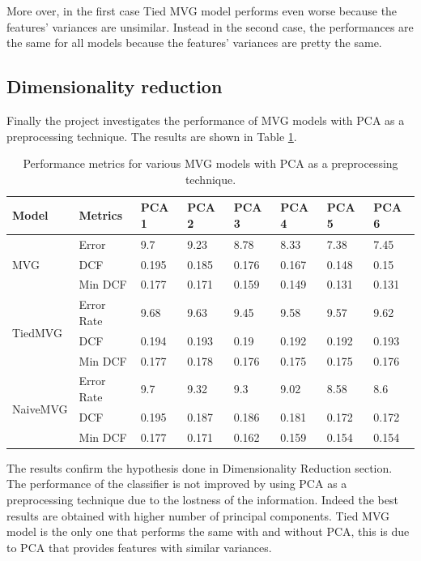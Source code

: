 \documentclass{article}
\begin{document}
More over, in the first case Tied MVG model performs even worse because the features' variances are unsimilar. Instead in the second case, the performances are the same for all models because the features' variances are pretty the same.

\subsection{Dimensionality reduction}
Finally the project investigates the performance of MVG models with PCA as a preprocessing technique. The results are shown in Table \ref{tab:mvg_performance_pca}.

\begin{table}[ht]
    \centering
    \begin{tabularx}{\textwidth}{ll*{6}{X}}
        \toprule
        \textbf{Model} & \textbf{Metrics} & \textbf{PCA 1} & \textbf{PCA 2} & \textbf{PCA 3} & \textbf{PCA 4} & \textbf{PCA 5} & \textbf{PCA 6} \\
        \midrule
        \multirow{3}{*}{MVG} & Error & 9.7 & 9.23 & 8.78 & 8.33 & 7.38 & 7.45 \\
                              & DCF & 0.195 & 0.185 & 0.176 & 0.167 & 0.148 & 0.15 \\
                              & Min DCF & 0.177 & 0.171 & 0.159 & 0.149 & 0.131 & 0.131 \\
        \midrule
        \multirow{3}{*}{TiedMVG} & Error Rate & 9.68 & 9.63 & 9.45 & 9.58 & 9.57 & 9.62 \\
                                 & DCF & 0.194 & 0.193 & 0.19 & 0.192 & 0.192 & 0.193 \\
                                 & Min DCF & 0.177 & 0.178 & 0.176 & 0.175 & 0.175 & 0.176 \\
        \midrule
        \multirow{3}{*}{NaiveMVG} & Error Rate & 9.7 & 9.32 & 9.3 & 9.02 & 8.58 & 8.6 \\
                                  & DCF & 0.195 & 0.187 & 0.186 & 0.181 & 0.172 & 0.172 \\
                                  & Min DCF & 0.177 & 0.171 & 0.162 & 0.159 & 0.154 & 0.154 \\
        \bottomrule
    \end{tabularx}
    \caption{Performance metrics for various MVG models with PCA as a preprocessing technique.}
    \label{tab:mvg_performance_pca}
\end{table}

The results confirm the hypothesis done in Dimensionality Reduction section. The performance of the classifier is not improved by using PCA as a preprocessing technique due to the lostness of the information. Indeed the best results are obtained with higher number of principal components. Tied MVG model is the only one that performs the same with and without PCA, this is due to PCA that provides features with similar variances.
\end{document}
